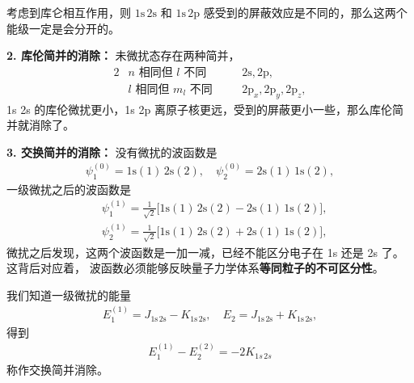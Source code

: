 考虑到库仑相互作用，则 $\mathrm{1s\,2s}$ 和 $\mathrm{1s\,2p}$ 感受到的屏蔽效应是不同的，那么这两个能级一定是会分开的。


\textbf{2. 库伦简并的消除：}
未微扰态存在两种简并，
\begin{alignat}{2}
    &\text{$n$ 相同但 $l$ 不同}\quad &&\mathrm{2s, 2p},\\
    &\text{$l$ 相同但 $m_l$ 不同}\quad &&\mathrm{2p}_x, \mathrm{2p}_y, \mathrm{2p}_z,
\end{alignat}
1s 2s 的库伦微扰更小，1s 2p 离原子核更远，受到的屏蔽更小一些，那么库伦简并就消除了。

\textbf{3. 交换简并的消除：}
没有微扰的波函数是
\begin{align}
    \psi_1^{(0)} = \mathrm{1s(1)\,2s(2)}, \quad 
    \psi_2^{(0)} = \mathrm{2s(1)\,1s(2)},
\end{align}
一级微扰之后的波函数是
\begin{align}
    &\psi_1^{(1)} = \frac1{\sqrt2} \big[\mathrm{1s(1)\,2s(2) - 2s(1)\,1s(2)}\big], \\
    &\psi_2^{(1)} = \frac1{\sqrt2} \big[\mathrm{1s(1)\,2s(2) + 2s(1)\,1s(2)}\big],
\end{align}
微扰之后发现，这两个波函数是一加一减，已经不能区分电子在 1s 还是 2s 了。这背后对应着，
波函数必须能够反映量子力学体系\textbf{等同粒子的不可区分性}。

我们知道一级微扰的能量
\begin{align}
    E_1^{(1)} = J_{\mathrm{1s\,2s}} - K_{\mathrm{1s\,2s}},\quad E_2 = J_{\mathrm{1s\,2s}} + K_{\mathrm{1s\,2s}},
\end{align}
得到
\begin{align}
    E_1^{(1)} - E_2^{(2)} = - 2K_{1s\,2s}
\end{align}
称作交换简并消除。

